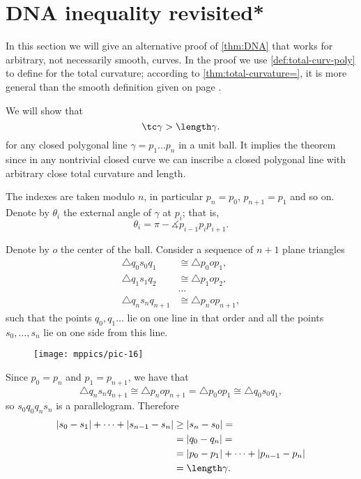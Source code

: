\section*{DNA inequality revisited*}

In this section we will give an alternative proof of \ref{thm:DNA} that works for arbitrary, not necessarily smooth, curves.
In the proof we use \ref{def:total-curv-poly} to define for the total curvature;
according to \ref{thm:total-curvature=}, it is more general than the smooth definition given on page \pageref{page:total curvature of:smooth-def}.

We will show that 
\[\tc\gamma> \length\gamma.\]
for any closed polygonal line $\gamma=p_1\dots p_{n}$ in a unit ball.
It implies the theorem since in any nontrivial closed curve we can inscribe a closed polygonal line with arbitrary close total curvature and length.

The indexes are taken modulo $n$, in particular $p_{n}=p_0$, $p_{n+1}=p_1$ and so on.
Denote by $\theta_i$ the external angle of $\gamma$ at $p_i$;
that is,
\[\theta_i=\pi-\measuredangle p_{i-1}p_ip_{i+1}.\]

Denote by $o$ the center of the ball.
Consider a sequence of $n+1$ plane triangles
\begin{align*}
\triangle q_0s_0q_1
&\cong 
\triangle p_0op_1,
\\
\triangle q_1s_1q_2
&\cong 
\triangle p_1op_2,
\\
&\dots
\\
\triangle q_{n}s_nq_{n+1}
&\cong 
\triangle p_nop_{n+1},
\end{align*}
such that the points $q_0,q_1\dots$ lie on one line in that order and all the points $s_0,\dots,s_n$ lie on one side from this line.

\begin{figure}[h!]
\vskip-0mm
\centering
\texttt{[image: mppics/pic-16]}
\vskip0mm
\end{figure}

Since $p_0=p_n$ and $p_1=p_{n+1}$, we have that
\[\triangle q_{n}s_nq_{n+1}\cong 
\triangle p_nop_{n+1}=\triangle p_0op_1\cong\triangle q_{0}s_0q_1,\]
so $s_0q_0q_ns_n$ is a parallelogram.
Therefore
\begin{align*}
|s_0-s_1|+\dots+|s_{n-1}-s_n|
&\ge|s_n-s_0|=
\\
&=|q_0-q_n|=
\\
&=|p_0-p_1|+\dots+|p_{n-1}-p_n|
\\
&=\length \gamma.
\end{align*}

